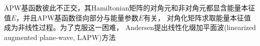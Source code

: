 %
APW基函数彼此不正交，其Hamiltonian矩阵的对角元和非对角元都显含能量本征值$E$，并且APW基函数径向部分与能量参数$E$有关，%
对角化矩阵求取能量本征值成为非线性过程。为了克服这一困难，%
Andersen提出线性化缀加平面波(linearized augmented plane-wave, LAPW)方法\cite{PRB12-3060_1975}
